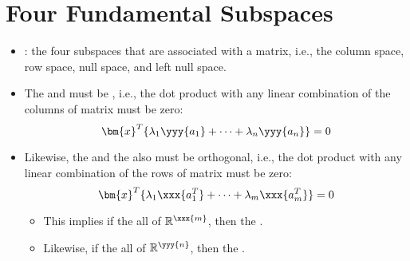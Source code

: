 \section{Four Fundamental Subspaces}\label{Four Fundamental Subspaces}
\begin{itemize}
  \item {}: the four subspaces that are associated with a matrix, i.e., the column space, row space, null space, and left null space.
  \item The  and  must be \hyperref[Geometric Interpretation of the Dot Product]{}, i.e., the dot product with any linear combination of the columns of matrix  must be zero:
  \[%
  \bm{x}^T\{\lambda_1 \yyy{a_1} + \cdots + \lambda_n \yyy{a_n}\} = 0
  \]%
  \item Likewise, the  and the  also must be orthogonal, i.e., the dot product with any linear combination of the rows of matrix  must be zero:
  \[%
  \bm{x}^T\{\lambda_1 \xxx{a_1^T} + \cdots + \lambda_m \xxx{a_m^T}\} = 0
  \]%
  \begin{itemize}
    \item This implies if the  all of \(\mathbb{R}^\xxx{m}\), then the .
    \item Likewise, if the  all of \(\mathbb{R}^\yyy{n}\), then the .
  \end{itemize}
  

\end{itemize}
